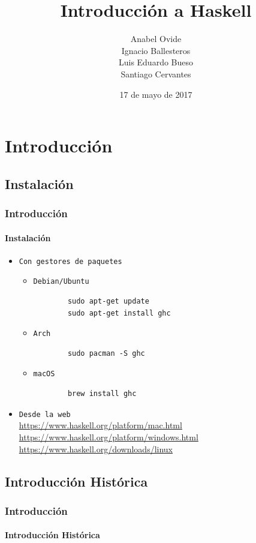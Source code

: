 \documentclass{beamer}
\title{Introducción a Haskell}
\subtitle{}
\date{17 de mayo de 2017}
\author{Anabel Ovide\\Ignacio Ballesteros\\Luis Eduardo Bueso\\Santiago Cervantes}
\institute{\url{https://github.com/edububa/haskell_course}}
\begin{document}
\maketitle



\section{Introducción}
\subsection{Instalación}
\begin{frame}[fragile]
  \frametitle{Introducción}
  \framesubtitle{Instalación}
  \begin{itemize}
  \item\texttt{Con gestores de paquetes}
    \begin{itemize}
    \item\texttt{Debian/Ubuntu}
      \begin{verbatim}
        sudo apt-get update
        sudo apt-get install ghc
      \end{verbatim}
    \item\texttt{Arch}
      \begin{verbatim}
        sudo pacman -S ghc
      \end{verbatim}
    \item\texttt{macOS}
      \begin{verbatim}
        brew install ghc
      \end{verbatim}
    \end{itemize}
  \item\texttt{Desde la web}\\
    \url{https://www.haskell.org/platform/mac.html}\\
    \url{https://www.haskell.org/platform/windows.html}\\
    \url{https://www.haskell.org/downloads/linux}
  \end{itemize}
\end{frame}

\subsection{Introducción Histórica}
\begin{frame}[fragile]          %
  \frametitle{Introducción}
  \framesubtitle{Introducción Histórica}

\end{frame}
\end{document}
